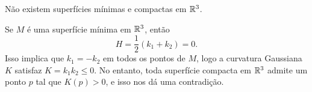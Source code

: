\begin{proposicao}
	Não existem superfícies mínimas e compactas em $\mathbb R^3$.
\end{proposicao}

\begin{demonstracao}
	Se $M$ é uma superfície mínima em $\mathbb R^3$, então
	\begin{equation*}
		H = \frac{1}{2} (k_1 + k_2) = 0.
	\end{equation*}
	Isso implica que $k_1=-k_2$ em todos os pontos de $M$, logo a curvatura Gaussiana $K$ satisfaz $K = k_1 k_2 \leq 0$. No entanto, toda superfície compacta em $\mathbb R^3$ admite um ponto $p$ tal que $K(p)>0$, e isso nos dá uma contradição.
\end{demonstracao}

